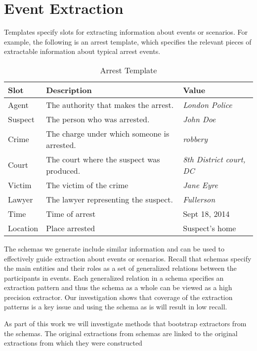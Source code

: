 \section{Event Extraction}

Templates specify slots for extracting information about events or scenarios. For example, the following is an arrest template, which specifies the relevant pieces of extractable information about typical arrest events. 
\begin{table}[htdp]
\begin{center}
\begin{tabular}{|p{2cm}|p{8cm}|p{4cm}|}
\hline
Slot & Description & Value\\
\hline
Agent & The authority that makes the arrest. & {\em London Police}\\
Suspect & The person who was arrested. & {\em John Doe}\\
Crime & The charge under which someone is arrested. & {\em robbery}\\
Court  & The court where the suspect was produced. & {\em 8th District court, DC} \\ 
Victim & The victim of the crime & {\em Jane Eyre}\\
Lawyer & The lawyer representing the suspect. & {\em Fullerson}\\
\hline
Time & Time of arrest & Sept 18, 2014\\
Location & Place arrested & Suspect's home\\
\hline
\end{tabular}
\caption{Arrest Template}
\end{center}
\label{default}
\end{table}%

The schemas we generate include similar information and can be used to effectively guide extraction about events or scenarios. 
Recall that schemas specify the main entities and their roles as a set of generalized relations between the participants in events. 
Each generalized relation in a schema specifies an extraction pattern and thus the schema as a whole can be viewed as a high precision extractor. Our investigation shows that coverage of the extraction patterns is a key issue and using the schema as is will result in low recall. 

As part of this work we will investigate methods that bootstrap extractors from the schemas. The original extractions from schemas are linked to the original extractions from which they were constructed

